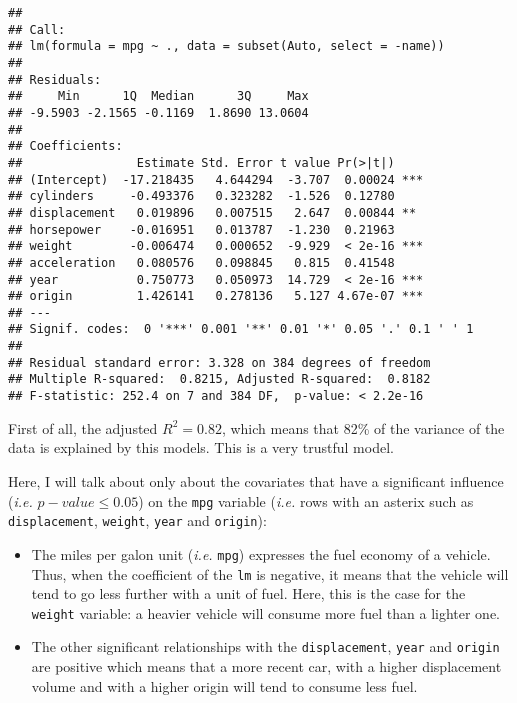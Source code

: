 \documentclass[
  12pt,
  oneside]{report}
\begin{document}
\begin{verbatim}
## 
## Call:
## lm(formula = mpg ~ ., data = subset(Auto, select = -name))
## 
## Residuals:
##     Min      1Q  Median      3Q     Max 
## -9.5903 -2.1565 -0.1169  1.8690 13.0604 
## 
## Coefficients:
##                Estimate Std. Error t value Pr(>|t|)    
## (Intercept)  -17.218435   4.644294  -3.707  0.00024 ***
## cylinders     -0.493376   0.323282  -1.526  0.12780    
## displacement   0.019896   0.007515   2.647  0.00844 ** 
## horsepower    -0.016951   0.013787  -1.230  0.21963    
## weight        -0.006474   0.000652  -9.929  < 2e-16 ***
## acceleration   0.080576   0.098845   0.815  0.41548    
## year           0.750773   0.050973  14.729  < 2e-16 ***
## origin         1.426141   0.278136   5.127 4.67e-07 ***
## ---
## Signif. codes:  0 '***' 0.001 '**' 0.01 '*' 0.05 '.' 0.1 ' ' 1
## 
## Residual standard error: 3.328 on 384 degrees of freedom
## Multiple R-squared:  0.8215, Adjusted R-squared:  0.8182 
## F-statistic: 252.4 on 7 and 384 DF,  p-value: < 2.2e-16
\end{verbatim}

First of all, the adjusted \(R^2 = 0.82\), which means that 82\% of the variance of the data is explained by this models. This is a very trustful model.

Here, I will talk about only about the covariates that have a significant influence (\emph{i.e.} \(p-value \leq 0.05\)) on the \texttt{mpg} variable (\emph{i.e.} rows with an asterix such as \texttt{displacement}, \texttt{weight}, \texttt{year} and \texttt{origin}):

\begin{itemize}
\item
  The miles per galon unit (\emph{i.e.} \texttt{mpg}) expresses the fuel economy of a vehicle. Thus, when the coefficient of the \texttt{lm} is negative, it means that the vehicle will tend to go less further with a unit of fuel. Here, this is the case for the \texttt{weight} variable: a heavier vehicle will consume more fuel than a lighter one.
\item
  The other significant relationships with the \texttt{displacement}, \texttt{year} and \texttt{origin} are positive which means that a more recent car, with a higher displacement volume and with a higher origin will tend to consume less fuel.
\end{itemize}

\newpage

\hypertarget{section-1}{%
\section{}\label{section-1}}
\end{document}
